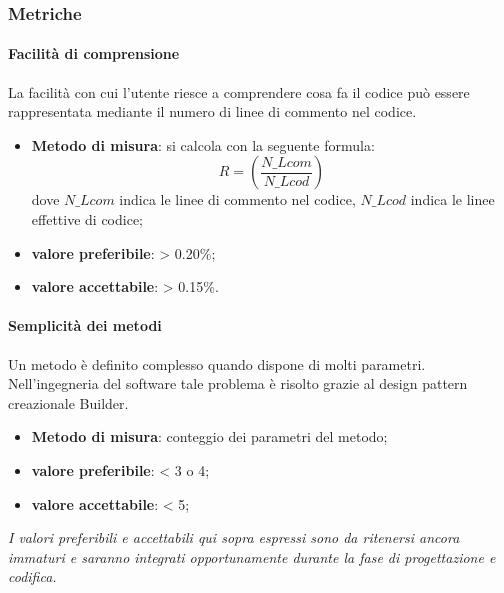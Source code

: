 \subsubsection{Metriche}

\paragraph{Facilità di comprensione}
La facilità con cui l’utente riesce a comprendere cosa fa il codice può essere rappresentata mediante il numero di linee di commento nel codice.
\begin{itemize}
\item \textbf{Metodo di misura}: si calcola con la seguente formula:
\[R = (\frac{N\_Lcom}{N\_Lcod})\]
dove $N\_Lcom$ indica le linee di commento nel codice, $N\_Lcod$ indica le linee effettive di codice;
\item \textbf{valore preferibile}: > 0.20\%;
\item \textbf{valore accettabile}: > 0.15\%.
\end{itemize}

\paragraph{Semplicità dei metodi}
Un metodo è definito complesso quando dispone di molti parametri. Nell'ingegneria del software tale problema è risolto grazie al design pattern creazionale Builder.
\begin{itemize}
\item \textbf{Metodo di misura}: conteggio dei parametri del metodo;
\item \textbf{valore preferibile}: < 3 o 4;
\item \textbf{valore accettabile}: < 5;
\end{itemize}

\textit{I valori preferibili e accettabili qui sopra espressi sono da ritenersi ancora immaturi e saranno integrati opportunamente durante la fase di progettazione e codifica.}
 

